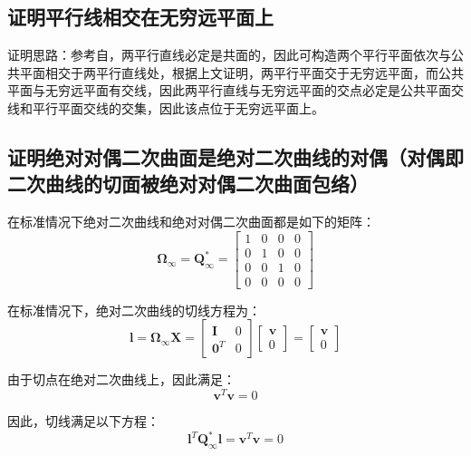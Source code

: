 \documentclass[11pt]{article}
\begin{document}
\subsection{证明平行线相交在无穷远平面上}
证明思路：参考自\cite{MultipleViewGeometrya}，两平行直线必定是共面的，因此可构造两个平行平面依次与公共平面相交于两平行直线处，根据上文证明，两平行平面交于无穷远平面，而公共平面与无穷远平面有交线，因此两平行直线与无穷远平面的交点必定是公共平面交线和平行平面交线的交集，因此该点位于无穷远平面上。
\subsection{证明绝对对偶二次曲面是绝对二次曲线的对偶（对偶即二次曲线的切面被绝对对偶二次曲面包络）}
在标准情况下绝对二次曲线和绝对对偶二次曲面都是如下的矩阵：
\begin{equation*}
  \mathbold{\Omega}_\infty=\mathbold{Q}^*_\infty=\begin{bmatrix}
    1 & 0 & 0 & 0 \\
    0 & 1 & 0 & 0 \\
    0 & 0 & 1 & 0 \\
    0 & 0 & 0 & 0
  \end{bmatrix}
\end{equation*}\par
在标准情况下，绝对二次曲线的切线方程为：
\begin{equation*}
  \mathbold{l}=\mathbold{\Omega}_\infty\mathbold{X}=\begin{bmatrix}
    \mathbf{I}   & 0 \\
    \mathbf{0}^T & 0
  \end{bmatrix}\begin{bmatrix}
    \mathbf{v} \\ 0
  \end{bmatrix}=\begin{bmatrix}
    \mathbf{v} \\ 0
  \end{bmatrix}
\end{equation*}\par
由于切点在绝对二次曲线上，因此满足：
\begin{equation*}
  \mathbold{v}^T\mathbold{v}=0
\end{equation*}\par
因此，切线满足以下方程：
\begin{equation*}
  \mathbf{l}^T\mathbf{Q}_\infty^*\mathbf{l}=\mathbf{v}^T\mathbf{v}=0
\end{equation*}\par
\end{document}
